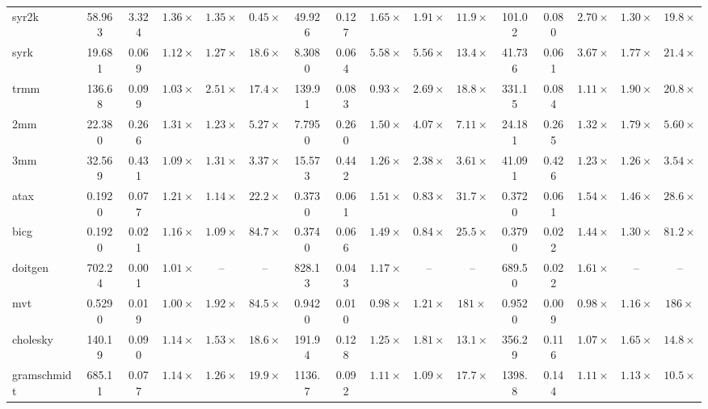 \begin{table}[tbp]
{\begin{tabular}{lccccccccccccccc}
syr2k & 58.963 & 3.324 & \(1.36\times\) & \(1.35\times\) & \(0.45\times\) & 49.926 & 0.127 & \(1.65\times\) & \(1.91\times\) & \(11.9\times\) & 101.02 & 0.080 & \(2.70\times\) & \(1.30\times\) & \(19.8\times\) \\
syrk & 19.681 & 0.069 & \(1.12\times\) & \(1.27\times\) & \(18.6\times\) & 8.3080 & 0.064 & \(5.58\times\) & \(5.56\times\) & \(13.4\times\) & 41.736 & 0.061 & \(3.67\times\) & \(1.77\times\) & \(21.4\times\) \\
trmm & 136.68 & 0.099 & \(1.03\times\) & \(2.51\times\) & \(17.4\times\) & 139.91 & 0.083 & \(0.93\times\) & \(2.69\times\) & \(18.8\times\) & 331.15 & 0.084 & \(1.11\times\) & \(1.90\times\) & \(20.8\times\) \\
2mm & 22.380 & 0.266 & \(1.31\times\) & \(1.23\times\) & \(5.27\times\) & 7.7950 & 0.260 & \(1.50\times\) & \(4.07\times\) & \(7.11\times\) & 24.181 & 0.265 & \(1.32\times\) & \(1.79\times\) & \(5.60\times\) \\
3mm & 32.569 & 0.431 & \(1.09\times\) & \(1.31\times\) & \(3.37\times\) & 15.573 & 0.442 & \(1.26\times\) & \(2.38\times\) & \(3.61\times\) & 41.091 & 0.426 & \(1.23\times\) & \(1.26\times\) & \(3.54\times\) \\
atax & 0.1920 & 0.077 & \(1.21\times\) & \(1.14\times\) & \(22.2\times\) & 0.3730 & 0.061 & \(1.51\times\) & \(0.83\times\) & \(31.7\times\) & 0.3720 & 0.061 & \(1.54\times\) & \(1.46\times\) & \(28.6\times\) \\
bicg & 0.1920 & 0.021 & \(1.16\times\) & \(1.09\times\) & \(84.7\times\) & 0.3740 & 0.066 & \(1.49\times\) & \(0.84\times\) & \(25.5\times\) & 0.3790 & 0.022 & \(1.44\times\) & \(1.30\times\) & \(81.2\times\) \\
doitgen & 702.24 & 0.001 & \(1.01\times\) & -- & -- & 828.13 & 0.043 & \(1.17\times\) & -- & -- & 689.50 & 0.022 & \(1.61\times\) & -- & -- \\
mvt & 0.5290 & 0.019 & \(1.00\times\) & \(1.92\times\) & \(84.5\times\) & 0.9420 & 0.010 & \(0.98\times\) & \(1.21\times\) & \(181\times\) & 0.9520 & 0.009 & \(0.98\times\) & \(1.16\times\) & \(186\times\) \\
cholesky & 140.19 & 0.090 & \(1.14\times\) & \(1.53\times\) & \(18.6\times\) & 191.94 & 0.128 & \(1.25\times\) & \(1.81\times\) & \(13.1\times\) & 356.29 & 0.116 & \(1.07\times\) & \(1.65\times\) & \(14.8\times\) \\
gramschmidt & 685.11 & 0.077 & \(1.14\times\) & \(1.26\times\) & \(19.9\times\) & 1136.7 & 0.092 & \(1.11\times\) & \(1.09\times\) & \(17.7\times\) & 1398.8 & 0.144 & \(1.11\times\) & \(1.13\times\) & \(10.5\times\) \\

\end{tabular}}
\end{table}
